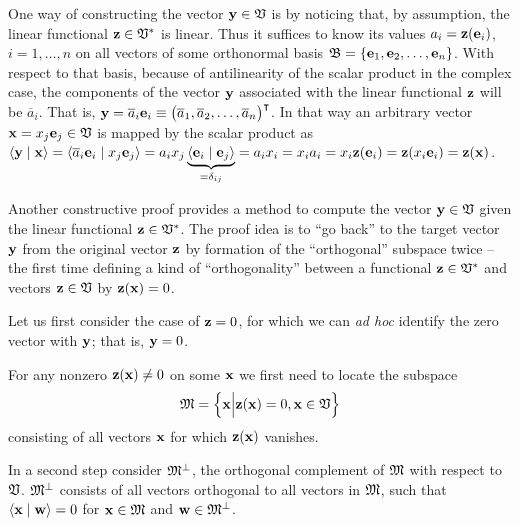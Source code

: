 {\color{OliveGreen}
\bproof
One way of constructing the vector ${\bf y}\in {\frak V}$ is by noticing that,
by assumption, the linear functional  ${\bf z} \in {\frak V}^\ast$ is linear.
Thus it suffices to know its values $a_i={\bf z} ({\bf e}_i)$, $i=1,\ldots , n$
on all vectors of some orthonormal basis
${\frak B}= \{ {\bf e}_1 ,   {\bf e}_2   , \ldots ,  {\bf e}_n \}$.
With respect to that basis, because of antilinearity of the scalar product in the complex case,
the components of the vector ${\bf y}$
associated with the linear functional ${\bf z}$ will be $\overline{a}_i$.
That is,
${\bf y} = \overline{a}_i {\bf e}_i \equiv \begin{pmatrix} \overline{a}_1,\overline{a}_2,\ldots , \overline{a}_n\end{pmatrix}^\intercal $.
In that way an arbitrary vector ${\bf x} = x_j {\bf e}_j \in {\frak V}$ is mapped by the
scalar product as
$\langle {\bf y} \mid {\bf x} \rangle = \langle \overline{a}_i {\bf e}_i  \mid x_j {\bf e}_j  \rangle
=  a_i x_j \underbrace{\langle  {\bf e}_i  \mid {\bf e}_j  \rangle}_{=\delta_{ij}}
=a_i x_i = x_i a_i =  x_i {\bf z} ({\bf e}_i) = {\bf z} (x_i{\bf e}_i)={\bf z} ({\bf x})$.

Another constructive proof
provides a method to compute the vector ${\bf y} \in {\frak V}$
given the linear functional
${\bf z} \in {\frak V}^\ast$.
The proof idea is to ``go back'' to the
target vector ${\bf y}$ from
the original vector ${\bf z}$
by formation of the ``orthogonal'' subspace twice
-- the first time defining a kind of ``orthogonality''
between a functional ${\bf z} \in {\frak V}^\ast$ and vectors ${\bf z} \in {\frak V}$
by ${\bf z} ({\bf x})=0$.

Let us first consider the case
of ${\bf z} =0$, for which we can {\it ad hoc} identify
the zero vector with ${\bf y}$; that is, ${\bf y}=0$.

For any nonzero ${\bf z}({\bf x}) \neq 0$  on some ${\bf x}$ we first need to locate the subspace
\begin{equation}
{\frak M}= \Big\{ {\bf x} \Big| {\bf z}({\bf x}) = 0, {\bf x} \in {\frak V} \Big\}
\end{equation}
consisting of all vectors ${\bf x}$ for which ${\bf z}({\bf x})$ vanishes.

In a second step consider ${\frak M}^\perp$, the orthogonal complement of ${\frak M}$ with respect to ${\frak V}$.
${\frak M}^\perp$ consists of all vectors  orthogonal to all vectors in  ${\frak M}$,
such that $\langle {\bf x}\mid {\bf w} \rangle =0$ for ${\bf x}\in {\frak M}$ and ${\bf w}\in {\frak M}^\perp$.

}
